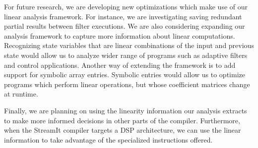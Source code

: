 For future research, we are developing new optimizations which make use
of our linear analysis framework. For instance, we are investigating saving
redundant partial results between filter executions. 
We are also considering expanding our analysis framework to capture
more information about linear computations. Recognizing state variables 
that are linear combinations of the input and previous state would 
allow us to analyze wider range of programs such as adaptive filters 
and control applications.
Another way of extending the framework is to add support for symbolic array entries.
Symbolic entries would allow us to optimize programs which perform
linear operations, but whose coefficient matrices change at runtime.

Finally, we are planning on using the linearity information our
analysis extracts to make more informed decisions in other parts of the compiler.
Furthermore, when the StreamIt compiler targets
a DSP architecture,  we can use the linear information to
take advantage of the specialized instructions offered.

